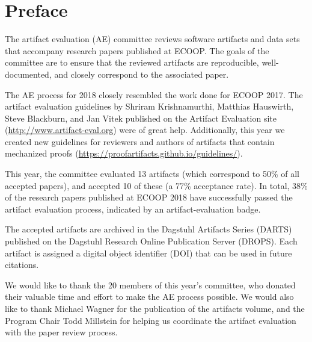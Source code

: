 \documentclass[a4paper,UKenglish]{dartsmaster}
\begin{document}
\chapter{Preface} %

The artifact evaluation (AE) committee reviews software artifacts and data sets that accompany research papers published at ECOOP. The goals of the committee are to ensure that the reviewed artifacts are reproducible, well-documented, and closely correspond to the associated paper. 

The AE process for 2018 closely resembled the work done for ECOOP 2017. The artifact evaluation guidelines by Shriram Krishnamurthi, Matthias
Hauswirth, Steve Blackburn, and Jan Vitek published on the Artifact
Evaluation site (\url{http://www.artifact-eval.org}) were of great help. Additionally, this year we created new guidelines for reviewers and authors of artifacts that contain mechanized proofs (\url{https://proofartifacts.github.io/guidelines/}). 

This year, the committee evaluated 13 artifacts (which correspond to 50\% of all
accepted papers), and accepted 10 of these (a 77\% acceptance rate). In total, 38\% of the research papers published at ECOOP 2018 have successfully passed the artifact evaluation process, indicated by an artifact-evaluation badge.

The accepted artifacts are archived in the Dagstuhl Artifacts Series (DARTS) published on the Dagstuhl Research Online Publication Server (DROPS). Each artifact is assigned a digital object identifier (DOI) that can be used in future citations. 

We would like to thank the 20 members of this year's committee, who donated their valuable time and effort to make the AE process possible. We would also like to thank  Michael Wagner for the publication of the artifacts volume, and the Program Chair Todd Millstein for helping us coordinate the artifact evaluation with the paper review process.
\end{document}
